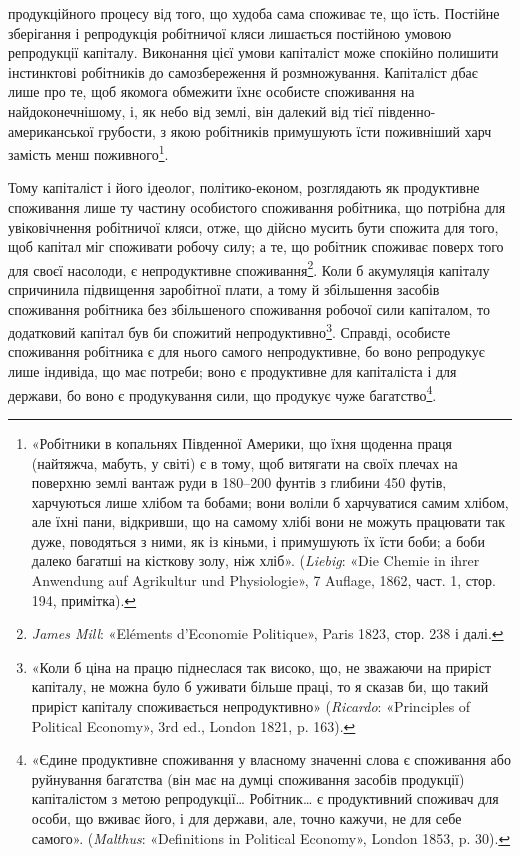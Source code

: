 \parcont{}  %
продукційного процесу від того, що худоба сама споживає
те, що їсть. Постійне зберігання і репродукція робітничої кляси
лишається постійною умовою репродукції капіталу. Виконання
цієї умови капіталіст може спокійно полишити інстинктові
робітників до самозбереження й розмножування. Капіталіст
дбає лише про те, щоб якомога обмежити їхнє особисте споживання
на найдоконечнішому, і, як небо від землі, він далекий від
тієї південно-американської грубости, з якою робітників примушують
їсти поживніший харч замість менш поживного\footnote{
«Робітники в копальнях Південної Америки, що їхня щоденна
праця (найтяжча, мабуть, у світі) є в тому, щоб витягати на своїх плечах
на поверхню землі вантаж руди в 180--200 фунтів з глибини 450 футів,
харчуються лише хлібом та бобами; вони воліли б харчуватися
самим хлібом, але їхні пани, відкривши, що на самому хлібі вони не
можуть працювати так дуже, поводяться з ними, як із кіньми, і примушують
їх їсти боби; а боби далеко багатші на кісткову золу, ніж хліб».
(\emph{Liebig}: «Die Chemie in ihrer Anwendung auf Agrikultur und Physiologie»,
7 Auflage, 1862, част. 1, стор. 194, примітка).
}.

Тому капіталіст і його ідеолог, політико-економ, розглядають
як продуктивне споживання лише ту частину особистого споживання
робітника, що потрібна для увіковічнення робітничої
кляси, отже, що дійсно мусить бути спожита для того, щоб капітал
міг споживати робочу силу; а те, що робітник споживає поверх
того для своєї насолоди, є непродуктивне споживання\footnote{
\emph{James Mill}: «Eléments d’Economie Politique», Paris 1823, стор. 238
і далі.
}.
Коли б акумуляція капіталу спричинила підвищення заробітної
плати, а тому й збільшення засобів споживання робітника без
збільшеного споживання робочої сили капіталом, то додатковий
капітал був би спожитий непродуктивно\footnote{
«Коли б ціна на працю піднеслася так високо, що, не зважаючи
на приріст капіталу, не можна було б уживати більше праці, то я сказав
би, що такий приріст капіталу споживається непродуктивно» (\emph{Ricardo}:
«Principles of Political Economy», 3rd ed., London 1821, p. 163).
}. Справді, особисте
споживання робітника є для нього самого непродуктивне, бо воно
репродукує лише індивіда, що має потреби; воно є продуктивне
для капіталіста і для держави, бо воно є продукування сили,
що продукує чуже багатство\footnote{
«Єдине продуктивне споживання у власному значенні слова є
споживання або руйнування багатства (він має на думці споживання
засобів продукції) капіталістом з метою репродукції\dots{} Робітник\dots{} є
продуктивний споживач для особи, що вживає його, і для держави, але,
точно кажучи, не для себе самого». (\emph{Malthus}: «Definitions in Political
Economy», London 1853, p. 30).
}.

